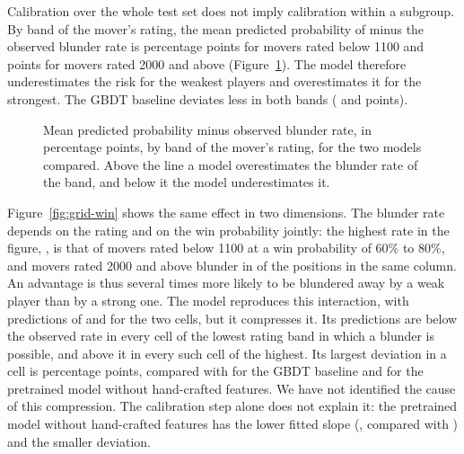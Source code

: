 \documentclass[11pt]{article}
\begin{document}
Calibration over the whole test set does not imply calibration within a
subgroup. By band of the mover's rating, the mean predicted probability of
 minus the observed blunder rate is
 percentage points for movers rated below
1100 and  points for movers rated 2000 and
above (Figure~\ref{fig:band-bias}). The model therefore underestimates the
risk for the weakest players and overestimates it for the strongest. The GBDT
baseline deviates less in both bands ( and
 points).

\begin{figure}[htbp]\centering
{}
\caption{Mean predicted probability minus observed blunder rate, in
percentage points, by band of the mover's rating, for the two models
compared. Above the line a model overestimates the blunder rate of the band,
and below it the model underestimates it.}
\label{fig:band-bias}
\end{figure}

Figure~\ref{fig:grid-win} shows the same effect in two dimensions. The
blunder rate depends on the rating and on the win probability jointly: the
highest rate in the figure, , is that of
movers rated below 1100 at a win probability of 60\% to 80\%, and movers
rated 2000 and above blunder in  of
the positions in the same column. An advantage is thus several times more
likely to be blundered away by a weak player than by a strong one. The model
reproduces this interaction, with predictions of
 and
 for the two cells, but it compresses it.
Its predictions are below the observed rate in every cell of the lowest
rating band in which a blunder is possible, and above it in every such cell
of the highest. Its largest deviation in a cell is
 percentage
points, compared with  for the GBDT
baseline\ifchangestart{} and
 for the
pretrained model without hand-crafted features\fi. We have not identified
the cause of this compression.\ifchangestart{} The calibration step alone
does not explain it: the pretrained model without hand-crafted features has
the lower fitted slope (,
compared with ) and the smaller deviation.\fi
\end{document}
